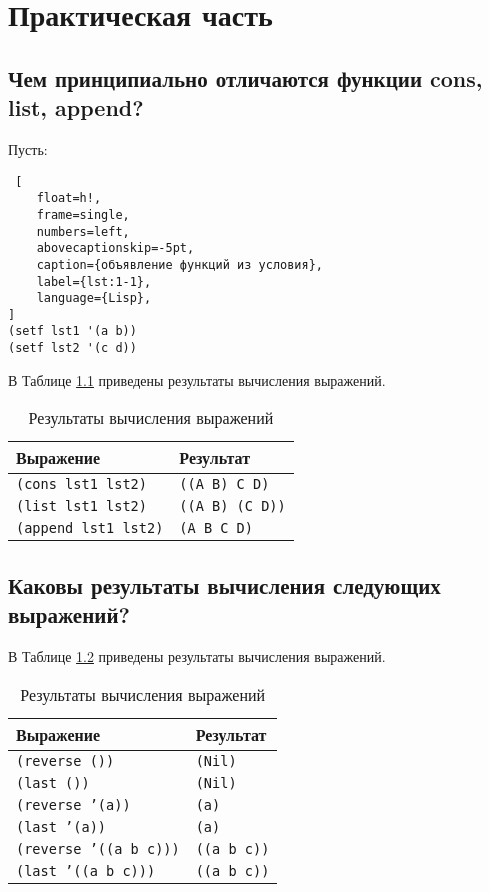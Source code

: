 \chapter{Практическая часть}

\section{Чем принципиально отличаются функции cons, list, append?}

Пусть:
\begin{lstlisting} [
	float=h!,
	frame=single,
	numbers=left,
	abovecaptionskip=-5pt,
	caption={объявление функций из условия},
	label={lst:1-1},
	language={Lisp},
]
(setf lst1 '(a b))
(setf lst2 '(c d))
\end{lstlisting}

В Таблице \ref{tbl:1-1} приведены результаты вычисления выражений.

\begin{table}[!ht]
	\begin{center}
		\caption{Результаты вычисления выражений}
		\label{tbl:1-1}
		\begin{tabular}{|l|l|}
			\hline
			\bfseries Выражение & \bfseries Результат\\\hline
            \texttt{(cons lst1 lst2)} & \texttt{((A B) C D)}\\\hline
            \texttt{(list lst1 lst2)} & \texttt{((A B) (C D))}\\\hline
            \texttt{(append lst1 lst2)} & \texttt{(A B C D)}\\\hline
		\end{tabular}
	\end{center}
\end{table}

\section{Каковы результаты вычисления следующих выражений?}

В Таблице \ref{tbl:2-1} приведены результаты вычисления выражений.

\begin{table}[!ht]
	\begin{center}
		\caption{Результаты вычисления выражений}
		\label{tbl:2-1}
		\begin{tabular}{|l|l|}
			\hline
			\bfseries Выражение & \bfseries Результат\\\hline
            \texttt{(reverse ())} & \texttt{(Nil)}\\\hline
            \texttt{(last ())} & \texttt{(Nil)}\\\hline
            \texttt{(reverse '(a))} & \texttt{(a)}\\\hline
            \texttt{(last '(a))} & \texttt{(a)}\\\hline
            \texttt{(reverse '((a b c)))} & \texttt{((a b c))}\\\hline
            \texttt{(last '((a b c)))} & \texttt{((a b c))}\\\hline
		\end{tabular}
	\end{center}
\end{table}

